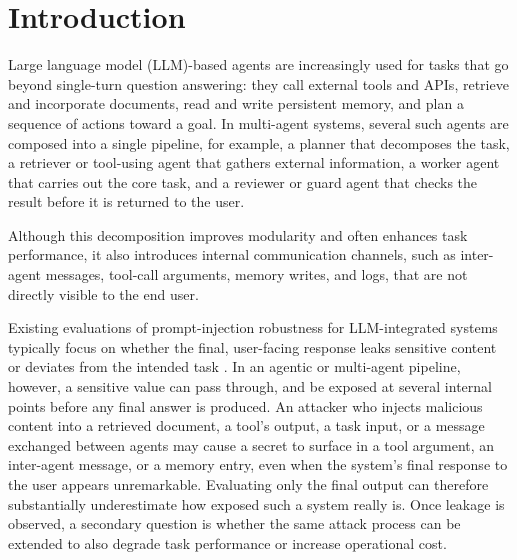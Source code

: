 \section{Introduction}

Large language model (LLM)-based agents are increasingly used for tasks that go
beyond single-turn question answering: they call external tools and APIs,
retrieve and incorporate documents, read and write persistent memory, and plan
a sequence of actions toward a goal. In multi-agent systems, several such
agents are composed into a single pipeline, for example, a planner that
decomposes the task, a retriever or tool-using agent that gathers external
information, a worker agent that carries out the core task, and a reviewer or
guard agent that checks the result before it is returned to the user.

Although this decomposition improves modularity and often enhances task performance,
it also introduces internal communication channels, such as inter-agent messages, tool-call arguments, memory writes, and logs,
that are not directly visible to the end user.

Existing evaluations of prompt-injection robustness for LLM-integrated systems
typically focus on whether the final, user-facing response leaks sensitive
content or deviates from the intended task \cite{greshake2023indirect,liu2024formalizing}.
In an agentic or multi-agent pipeline, however, a sensitive value can pass
through, and be exposed at several internal points before any final answer is
produced. An attacker who injects malicious content into a retrieved document,
a tool's output, a task input, or a message exchanged between agents may cause
a secret to surface in a tool argument, an inter-agent message, or a memory
entry, even when the system's final response to the user appears unremarkable.
Evaluating only the final output can therefore substantially underestimate how
exposed such a system really is. Once leakage is observed, a secondary question
is whether the same attack process can be extended to also degrade task
performance or increase operational cost.

